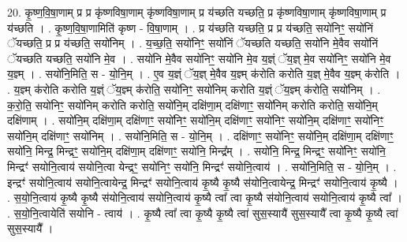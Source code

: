 \documentclass[17pt]{extarticle}
\begin{document}
20. कृ॒ष्ण॒वि॒षा॒णाम् प्र प्र कृ॑ष्णविषा॒णाम् कृ॑ष्णविषा॒णाम् प्र य॑च्छति यच्छति॒ प्र कृ॑ष्णविषा॒णाम् कृ॑ष्णविषा॒णाम् प्र य॑च्छति । . कृ॒ष्ण॒वि॒षा॒णामिति॑ कृष्ण - वि॒षा॒णाम् । . प्र य॑च्छति यच्छति॒ प्र प्र य॑च्छति॒ सयो॑निꣳ॒॒ सयो॑निं ॅयच्छति॒ प्र प्र य॑च्छति॒ सयो॑निम् । . य॒च्छ॒ति॒ सयो॑निꣳ॒॒ सयो॑निं ॅयच्छति यच्छति॒ सयो॑नि मे॒वैव सयो॑निं ॅयच्छति यच्छति॒ सयो॑नि मे॒व । . सयो॑नि मे॒वैव सयो॑निꣳ॒॒ सयो॑नि मे॒व य॒ज्ञ्ं ॅय॒ज्ञ् मे॒व सयो॑निꣳ॒॒ सयो॑नि मे॒व य॒ज्ञ्म् । . सयो॑नि॒मिति॒ स - यो॒नि॒म् । . ए॒व य॒ज्ञ्ं ॅय॒ज्ञ् मे॒वैव य॒ज्ञ्म् क॑रोति करोति य॒ज्ञ् मे॒वैव य॒ज्ञ्म् क॑रोति । . य॒ज्ञ्म् क॑रोति करोति य॒ज्ञ्ं ॅय॒ज्ञ्म् क॑रोति॒ सयो॑निꣳ॒॒ सयो॑निम् करोति य॒ज्ञ्ं ॅय॒ज्ञ्म् क॑रोति॒ सयो॑निम् । . क॒रो॒ति॒ सयो॑निꣳ॒॒ सयो॑निम् करोति करोति॒ सयो॑नि॒म् दक्षि॑णा॒म् दक्षि॑णाꣳ॒॒ सयो॑निम् करोति करोति॒ सयो॑नि॒म् दक्षि॑णाम् । . सयो॑नि॒म् दक्षि॑णा॒म् दक्षि॑णाꣳ॒॒ सयो॑निꣳ॒॒ सयो॑नि॒म् दक्षि॑णाꣳ॒॒ सयो॑निꣳ॒॒ सयो॑नि॒म् दक्षि॑णाꣳ॒॒ सयो॑निꣳ॒॒ सयो॑नि॒म् दक्षि॑णाꣳ॒॒ सयो॑निम् । . सयो॑नि॒मिति॒ स - यो॒नि॒म् । . दक्षि॑णाꣳ॒॒ सयो॑निꣳ॒॒ सयो॑नि॒म् दक्षि॑णा॒म् दक्षि॑णाꣳ॒॒ सयो॑नि॒ मिन्द्र॒ मिन्द्रꣳ॒॒ सयो॑नि॒म् दक्षि॑णा॒म् दक्षि॑णाꣳ॒॒ सयो॑नि॒ मिन्द्र᳚म् । . सयो॑नि॒ मिन्द्र॒ मिन्द्रꣳ॒॒ सयो॑निꣳ॒॒ सयो॑नि॒ मिन्द्रꣳ॑ सयोनि॒त्वाय॑ सयोनि॒त्वा येन्द्रꣳ॒॒ सयो॑निꣳ॒॒ सयो॑नि॒ मिन्द्रꣳ॑ सयोनि॒त्वाय॑ । . सयो॑नि॒मिति॒ स - यो॒नि॒म् । . इन्द्रꣳ॑ सयोनि॒त्वाय॑ सयोनि॒त्वायेन्द्र॒ मिन्द्रꣳ॑ सयोनि॒त्वाय॑ कृ॒ष्यै कृ॒ष्यै स॑योनि॒त्वायेन्द्र॒ मिन्द्रꣳ॑ सयोनि॒त्वाय॑ कृ॒ष्यै । . स॒यो॒नि॒त्वाय॑ कृ॒ष्यै कृ॒ष्यै स॑योनि॒त्वाय॑ सयोनि॒त्वाय॑ कृ॒ष्यै त्वा᳚ त्वा कृ॒ष्यै स॑योनि॒त्वाय॑ सयोनि॒त्वाय॑ कृ॒ष्यै त्वा᳚ । . स॒यो॒नि॒त्वायेति॑ सयोनि - त्वाय॑ । . कृ॒ष्यै त्वा᳚ त्वा कृ॒ष्यै कृ॒ष्यै त्वा॑ सुस॒स्यायै॑ सुस॒स्यायै᳚ त्वा कृ॒ष्यै कृ॒ष्यै त्वा॑ सुस॒स्यायै᳚ । \newline
\end{document}
